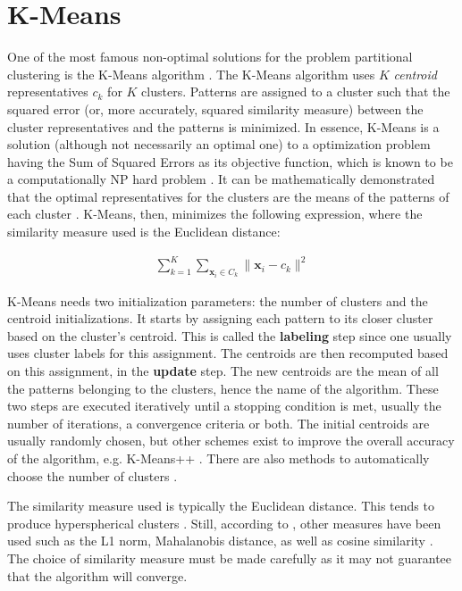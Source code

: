 \section{K-Means}

One of the most famous non-optimal solutions for the problem partitional clustering is the K-Means algorithm \cite{kmeansoriginal}.
The K-Means algorithm uses $K$ \emph{centroid} representatives $c_k$ for $K$ clusters.
Patterns are assigned to a cluster such that the squared error (or, more accurately, squared similarity measure) between the cluster representatives and the patterns is minimized.
In essence, K-Means is a solution (although not necessarily an optimal one) to a optimization problem having the Sum of Squared Errors as its objective function, which is known to be a computationally NP hard problem \cite{Jain2010}.
It can be mathematically demonstrated that the optimal representatives for the clusters are the means of the patterns of each cluster \cite{Aggarwal2014}.
K-Means, then, minimizes the following expression, where the similarity measure used is the Euclidean distance:

\begin{align}
    \sum^K_{k=1} \sum_{\mathbf{x}_i \in C_k} \| \mathbf{x}_i - c_k  \| ^2  \label{eq:sse}
\end{align}

K-Means needs two initialization parameters: the number of clusters and the centroid initializations.
It starts by assigning each pattern to its closer cluster based on the cluster's centroid.
This is called the \textbf{labeling} step since one usually uses cluster labels for this assignment.
The centroids are then recomputed based on this assignment, in the \textbf{update} step.
The new centroids are the mean of all the patterns belonging to the clusters, hence the name of the algorithm.
These two steps are executed iteratively until a stopping condition is met, usually the number of iterations, a convergence criteria or both.
The initial centroids are usually randomly chosen, but other schemes exist to improve the overall accuracy of the algorithm, e.g. K-Means++ \cite{Arthur2007}.
There are also methods to automatically choose the number of clusters \cite{Aggarwal2014}.

The similarity measure used is typically the Euclidean distance.
This tends to produce hyperspherical clusters \cite{Jain1999}.
Still, according to \cite{Jain2010}, other measures have been used such as the L1 norm, Mahalanobis distance, as well as cosine similarity \cite{Aggarwal2014}.
The choice of similarity measure must be made carefully as it may not guarantee that the algorithm will converge.

